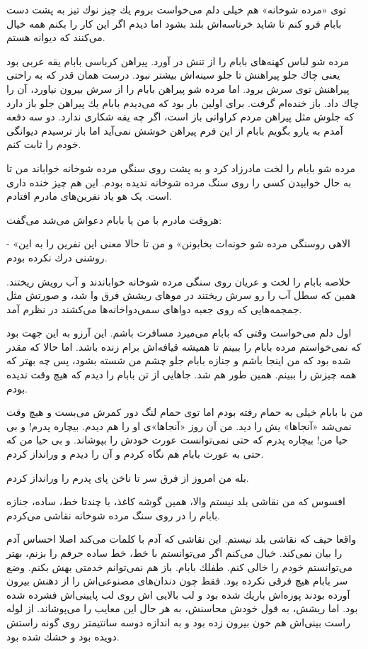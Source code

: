 \documentclass[12pt,a4paper]{book}
\begin{document}
توی «مرده شوخانه» هم خیلی دلم می‌خواست بروم يك چيز نوك تيز به پشت دست بابام فرو کنم تا شاید خرناسه‌اش بلند بشود اما دیدم اگر این کار را بکنم همه خیال می‌کنند که دیوانه هستم.

مرده شو لباس کهنه‌های بابام را از تنش در آورد. پیراهن کرباسی بابام يقه عربی بود یعنی چاك جلو پیراهنش تا جلو سینه‌اش بیشتر نبود. درست همان قدر که به راحتی پیراهنش توی سرش برود. اما مرده شو پیراهن بابام را از سرش بیرون نیاورد، آن را چاك داد. باز خنده‌ام گرفت. برای اولین بار بود که می‌دیدم بابام يك پیراهن جلو باز دارد که جلوش مثل پیراهن مردم کراواتی باز است، اگر چه يقه شکاری ندارد. دو سه دفعه آمدم به یارو بگویم بابام از این فرم پیراهن خوشش نمی‌آید اما باز ترسیدم دیوانگی خودم را ثابت کنم.

مرده شو بابام را لخت مادرزاد کرد و به پشت روی سنگی مرده شوخانه خواباند من تا به حال خوابیدن کسی را روی سنگ مرده شوخانه ندیده بودم. این هم چیز خنده داری است. یک هو یاد نفرین‌های مادرم افتادم.

هروقت مادرم با من یا بابام دعواش می‌شد می‌گفت:

- «الاهی روسنگی مرده شو خونه‌ات بخابونن» و من تا حالا معنی این نفرین را به این روشنی درك نكرده بودم.

خلاصه بابام را لخت و عریان روی سنگی مرده شوخانه خواباندند و آب رویش ریختند. همین که سطل آب را رو سرش ریختند در موهای ریشش فرق وا شد، و صورتش مثل جمجمه‌هایی که روی جعبه دواهای سمی‌دواخانه‌ها می‌کشند در نظرم آمد.

اول دلم می‌خواست وقتی که بابام می‌میرد مسافرت باشم. این آرزو به این جهت بود که نمی‌خواستم مرده بابام را ببینم تا همیشه قیافه‌اش برام زنده باشد. اما حالا که مقدر شده بود که من اینجا باشم و جنازه بابام جلو چشم من شسته بشود، پس چه بهتر که همه چیزش را ببینم. همین طور هم شد. جاهایی از تن بابام را دیدم که هیچ وقت ندیده بودم.

من با بابام خیلی به حمام رفته بودم اما توی حمام لنگ دور کمرش می‌بست و هیچ وقت نمی‌شد «آنجاها» یش را دید. من آن روز «آنجاها»ی او را هم دیدم.
بیچاره پدرم! و بی حیا من! بیچاره پدرم که حتی نمی‌توانست عورت خودش را
بپوشاند. و بی حیا من که حتی به عورت بابام هم نگاه کردم و آن را دیدم و ورانداز کردم.

بله من امروز از فرق سر تا ناخن پای پدرم را ورانداز کردم.

افسوس که من نقاشی بلد نیستم والا، همین گوشه کاغذ، با چندتا خط، ساده، جنازه بابام را در روی سنگ مرده شوخانه نقاشی می‌کردم.

واقعا حیف که نقاشی بلد نیستم. این نقاشی که آدم با کلمات می‌کند اصلا احساس آدم را بیان نمی‌کند. خیال می‌کنم اگر می‌توانستم با خط، خط ساده حرفم را بزنم، بهتر می‌توانستم خودم را خالی کنم. طفلك بابام. باز هم نمی‌توانم خدمتی بهش بکنم. وضع سر بابام هیچ فرقی نکرده بود. فقط چون دندان‌های مصنوعی‌اش را از دهنش بیرون آورده بودند پوزه‌اش باريك شده بود و لب بالایی اش روی لب پایینی‌اش فشرده شده بود. اما ریشش، به قول خودش محاسنش، به هر حال این معایب را می‌پوشاند. از لوله راست بینی‌اش هم خون بیرون زده بود و به اندازه دوسه سانتیمتر روی گونه راستش دویده بود و خشك شده بود.
\end{document}
